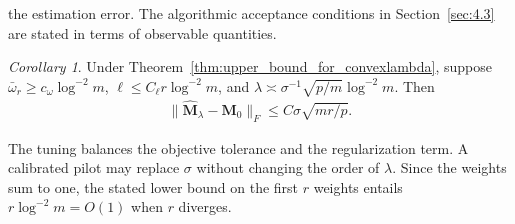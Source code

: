 \documentclass[numsec,webpdf,modern,large,namedate]{oup-authoring-template}
\theoremstyle{plain}
\theoremstyle{remark}
\newtheorem{corollary}{Corollary}[section]
\newcommand{\M}{\bm{M}}
\newif\ifmarkchanges
\newenvironment{revision}{\begingroup\ifmarkchanges\color{red}\fi}{\endgroup}
\begin{document}
\begin{revision}
the estimation error. The algorithmic acceptance conditions in
Section~\ref{sec:4.3} are stated in terms of observable quantities.
\begin{corollary}
\label{cor:convex_tuning_lambda}
Under Theorem~\ref{thm:upper_bound_for_convexlambda}, suppose
$\bar\omega_r\ge c_\omega\log^{-2}m$,
$\ell\le C_\ell r\log^{-2}m$, and
$\lambda\asymp\sigma^{-1}\sqrt{p/m}\log^{-2}m$. Then
\begin{align*}
 \|\widehat{\M}_\lambda-\M_0\|_F\le C\sigma\sqrt{mr/p}.
\end{align*}
\end{corollary}
The tuning balances the objective tolerance and the regularization term.
A calibrated pilot may replace $\sigma$ without changing the order of
$\lambda$. Since the weights sum to one, the stated lower bound on the
first $r$ weights entails $r\log^{-2}m=O(1)$ when $r$ diverges.
\end{revision}
\end{document}
